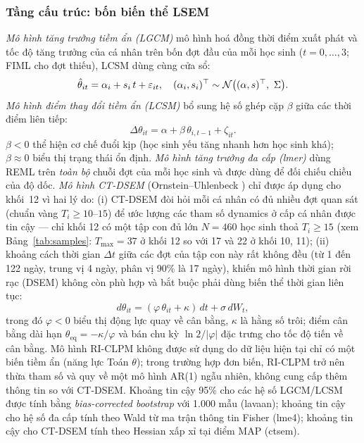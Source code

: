 \subsubsection{Tầng cấu trúc: bốn biến thể LSEM}

\textit{Mô hình tăng trưởng tiềm ẩn (LGCM)} \cite{mcardle2009} mô hình hoá đồng thời điểm xuất phát và tốc độ tăng trưởng của cá nhân trên bốn đợt đầu của mỗi học sinh (\(t = 0,\dots,3\); FIML cho đợt thiếu), LCSM dùng cùng cửa sổ:
\begin{equation}
\hat{\theta}_{it} = \alpha_i + s_i\,t + \varepsilon_{it}, \quad (\alpha_i, s_i)^\top \sim \mathcal{N}\big((\alpha, s)^\top,\ \Sigma\big).
\label{eq:lgcm}
\end{equation}
\textit{Mô hình điểm thay đổi tiềm ẩn (LCSM)} bổ sung hệ số ghép cặp \(\beta\) giữa các thời điểm liên tiếp:
\begin{equation}
\Delta \theta_{it} = \alpha + \beta\,\theta_{i,t-1} + \zeta_{it}.
\label{eq:lcsm}
\end{equation}
\(\beta < 0\) thể hiện cơ chế đuổi kịp (học sinh yếu tăng nhanh hơn học sinh khá); \(\beta \approx 0\) biểu thị trạng thái ổn định. \textit{Mô hình tăng trưởng đa cấp (lmer)} dùng REML trên \emph{toàn bộ} chuỗi đợt của mỗi học sinh và được dùng để đối chiếu chiều của độ dốc. \textit{Mô hình CT-DSEM} (Ornstein--Uhlenbeck \cite{driver2017,asparouhov2018}) chỉ được áp dụng cho khối~12 vì hai lý do: (i) CT-DSEM đòi hỏi mỗi cá nhân có đủ nhiều đợt quan sát (chuẩn vàng \(T_i \ge 10\text{--}15\)) để ước lượng các tham số dynamics ở cấp cá nhân được tin cậy --- chỉ khối 12 có một tập con đủ lớn \(N = 460\) học sinh thoả \(T_i \ge 15\) (xem Bảng~\ref{tab:samples}: \(T_{\max} = 37\) ở khối 12 so với 17 và 22 ở khối 10, 11); (ii) khoảng cách thời gian \(\Delta t\) giữa các đợt của tập con này rất không đều (từ 1 đến 122 ngày, trung vị 4 ngày, phân vị 90\% là 17 ngày), khiến mô hình thời gian rời rạc (DSEM) không còn phù hợp và bắt buộc phải dùng biến thể thời gian liên tục:
\begin{equation}
d\theta_{it} = (\varphi\,\theta_{it} + \kappa)\,dt + \sigma\,dW_t,
\label{eq:ctdsem}
\end{equation}
trong đó \(\varphi < 0\) biểu thị động lực quay về cân bằng, \(\kappa\) là hằng số trôi; điểm cân bằng dài hạn \(\theta_{\mathrm{eq}} = -\kappa/\varphi\) và bán chu kỳ \(\ln 2 / |\varphi|\) đặc trưng cho tốc độ tiến về cân bằng. Mô hình RI-CLPM \cite{hamaker2015} không được sử dụng do dữ liệu hiện tại chỉ có một biến tiềm ẩn (năng lực Toán \(\theta\)); trong trường hợp đơn biến, RI-CLPM trở nên thừa tham số và quy về một mô hình AR(1) ngẫu nhiên, không cung cấp thêm thông tin so với CT-DSEM. Khoảng tin cậy 95\% cho các hệ số LGCM/LCSM được tính bằng \emph{bias-corrected bootstrap} với 1{.}000 mẫu (lavaan); khoảng tin cậy cho hệ số đa cấp tính theo Wald từ ma trận thông tin Fisher (lme4); khoảng tin cậy cho CT-DSEM tính theo Hessian xấp xỉ tại điểm MAP (ctsem).

